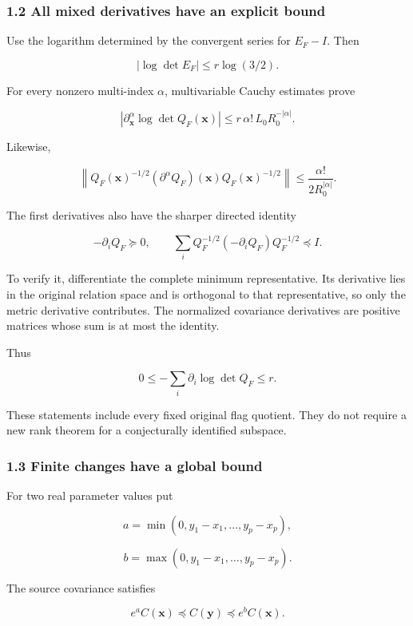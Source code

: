 \documentclass[11pt]{article}
\begin{document}
\subsubsection{1.2 All mixed derivatives have an explicit bound}\label{all-mixed-derivatives-have-an-explicit-bound}

Use the logarithm determined by the convergent series for \(E_F-I\). Then

\[
\left|\log\det E_F\right|
\le r\log(3/2).
\]

For every nonzero multi-index \(\alpha\), multivariable Cauchy estimates prove

\[
\boxed{
\left|
\partial_{\mathbf x}^{\alpha}
\log\det Q_F(\mathbf x)
\right|
\le
r\,\alpha!\,L_0R_0^{-|\alpha|}.
}
\tag{9}
\]

Likewise,

\[
\boxed{
\left\|
Q_F(\mathbf x)^{-1/2}
(\partial^\alpha Q_F)(\mathbf x)
Q_F(\mathbf x)^{-1/2}
\right\|
\le
\frac{\alpha!}{2R_0^{|\alpha|}}.
}
\tag{10}
\]

The first derivatives also have the sharper directed identity

\[
\boxed{
-\partial_iQ_F\succeq0,
\qquad
\sum_i
Q_F^{-1/2}(-\partial_iQ_F)Q_F^{-1/2}
\preceq I.
}
\tag{11}
\]

To verify it, differentiate the complete minimum representative. Its derivative lies in the original relation space and is orthogonal to that representative, so only the metric derivative contributes. The normalized covariance derivatives are positive matrices whose sum is at most the identity.

Thus

\[
0\le-\sum_i\partial_i\log\det Q_F\le r.
\]

These statements include every fixed original flag quotient. They do not require a new rank theorem for a conjecturally identified subspace.

\subsubsection{1.3 Finite changes have a global bound}\label{finite-changes-have-a-global-bound}

For two real parameter values put

\[
a=\min(0,y_1-x_1,\ldots,y_p-x_p),
\]

\[
b=\max(0,y_1-x_1,\ldots,y_p-x_p).
\]

The source covariance satisfies

\[
e^aC(\mathbf x)\preceq C(\mathbf y)\preceq e^bC(\mathbf x).
\]
\end{document}

